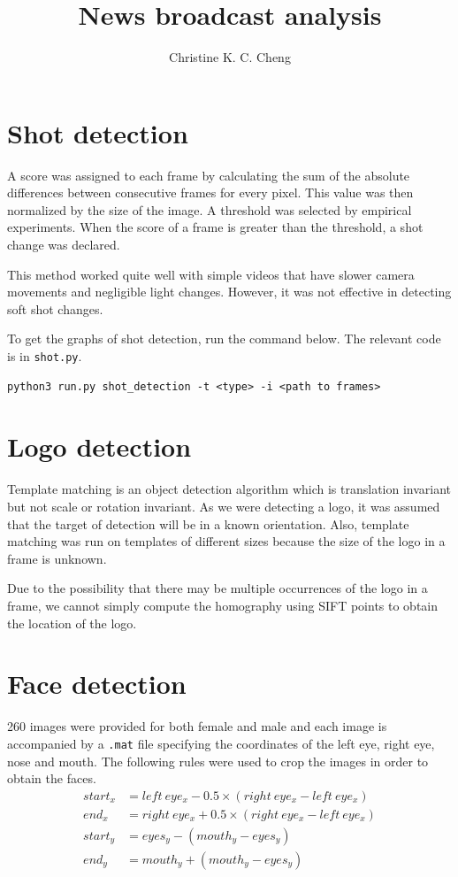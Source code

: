 \documentclass{article}
\title{News broadcast analysis}
\author{
	Christine K. C. Cheng
}
\begin{document}
\maketitle

\section{Shot detection}
A score was assigned to each frame by calculating the sum of the absolute differences between consecutive frames for every pixel. This value was then normalized by the size of the image. A threshold was selected by empirical experiments. When the score of a frame is greater than the threshold, a shot change was declared.

This method worked quite well with simple videos that have slower camera movements and negligible light changes. However, it was not effective in detecting soft shot changes.

To get the graphs of shot detection, run the command below. The relevant code is in \texttt{shot.py}.
\begin{verbatim}
python3 run.py shot_detection -t <type> -i <path to frames>
\end{verbatim}

\section{Logo detection}
Template matching is an object detection algorithm which is translation invariant but not scale or rotation invariant. As we were detecting a logo, it was assumed that the target of detection will be in a known orientation. Also, template matching was run on templates of different sizes because the size of the logo in a frame is unknown. 

Due to the possibility that there may be multiple occurrences of the logo in a frame, we cannot simply compute the homography using SIFT points to obtain the location of the logo.

\section{Face detection}
260 images were provided for both female and male and each image is accompanied by a \texttt{.mat} file specifying the coordinates of the left eye, right eye, nose and mouth. The following rules were used to crop the images in order to obtain the faces.
\begin{equation}
\begin{split}
start_x &= left~eye_x - 0.5\times(right~eye_x - left~eye_x) \\
end_x &= right~eye_x + 0.5\times(right~eye_x - left~eye_x) \\
start_y &= eyes_y - (mouth_y - eyes_y) \\
end_y &= mouth_y + (mouth_y - eyes_y) \\
\end{split}
\end{equation}
\end{document}
